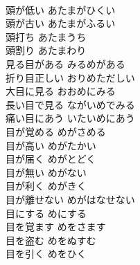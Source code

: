 \documentclass[8pt]{extreport}
\begin{document}
\begin{CJK}{UTF8}{min}
\\	頭が低い	あたまがひくい	
\\	頭が古い	あたまがふるい	
\\	頭打ち	あたまうち	
\\	頭割り	あたまわり	
\\	見る目がある	みるめがある	
\\	折り目正しい	おりめただしい	
\\	大目に見る	おおめにみる	
\\	長い目で見る	ながいめでみる	
\\	痛い目にあう	いたいめにあう	
\\	目が覚める	めがさめる	
\\	目が高い	めがたかい	
\\	目が届く	めがとどく	
\\	目が無い	めがない	
\\	目が利く	めがきく	
\\	目が離せない	めがはなせない	
\\	目にする	めにする	
\\	目を覚ます	めをさます	
\\	目を盗む	めをぬすむ	
\\	目を引く	めをひく	
\end{CJK}
\end{document}
